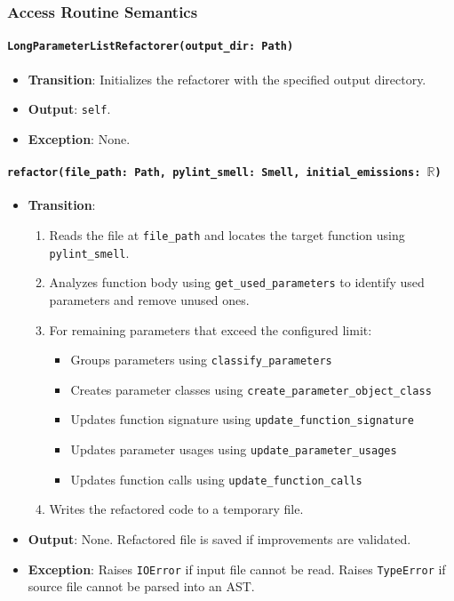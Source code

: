 \documentclass[12pt, titlepage]{article}
\begin{document}
\subsubsection{Access Routine Semantics}

\paragraph{\texttt{LongParameterListRefactorer(output\_dir: Path)}}
\begin{itemize}
\item \textbf{Transition}: Initializes the refactorer with the specified output directory.
\item \textbf{Output}: \texttt{self}.
\item \textbf{Exception}: None.
\end{itemize}

\paragraph{\texttt{refactor(file\_path: Path, pylint\_smell: Smell, initial\_emissions: $\mathbb{R}$)}}
\begin{itemize}
  \item \textbf{Transition}:
  \begin{enumerate}
  \item Reads the file at \texttt{file\_path} and locates the target function using \texttt{pylint\_smell}.
  \item Analyzes function body using \texttt{get\_used\_parameters} to identify used parameters and remove unused ones.
  \item For remaining parameters that exceed the configured limit:
    \begin{itemize}
      \item Groups parameters using \texttt{classify\_parameters}
      \item Creates parameter classes using \texttt{create\_parameter\_object\_class}
      \item Updates function signature using \texttt{update\_function\_signature}
      \item Updates parameter usages using \texttt{update\_parameter\_usages}
      \item Updates function calls using \texttt{update\_function\_calls}
    \end{itemize}
  \item Writes the refactored code to a temporary file.
  \end{enumerate}
  \item \textbf{Output}: None. Refactored file is saved if improvements are validated. 
  \item \textbf{Exception}: Raises \texttt{IOError} if input file cannot be read. Raises \texttt{TypeError} if source file cannot be parsed into an AST.
  \end{itemize}
\end{document}
